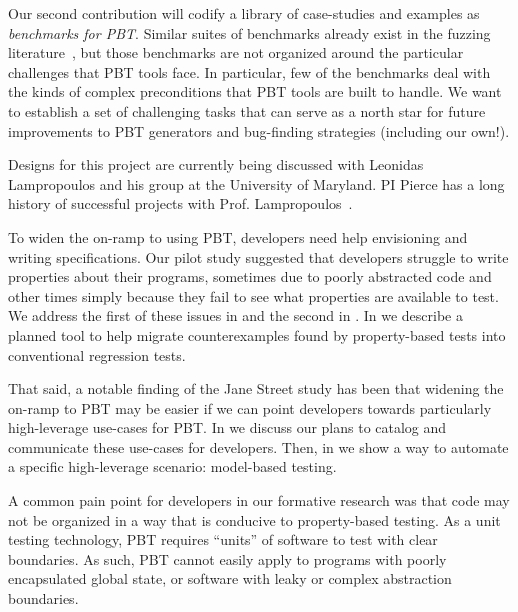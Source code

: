 Our second contribution will codify a library of case-studies and examples as
{\em benchmarks for PBT}. Similar suites of benchmarks already exist in the
fuzzing literature~\cite{hazimeh_magma_2021}, but those benchmarks are not
organized around the particular challenges that PBT tools face. In particular,
few of the benchmarks deal with the kinds of complex preconditions that PBT
tools are built to handle. We want to establish a set of challenging tasks that
can serve as a north star for future improvements to PBT generators and
bug-finding strategies (including our own!).

Designs for this project are currently being discussed with Leonidas
Lampropoulos and his group at the University of Maryland. PI Pierce has a long
history of successful projects with Prof.
Lampropoulos~\cite[etc.]{LuckPOPL,goldstein2021dojudgeatest,lampropoulos_coverage_2019,Lampropoulos&18,OLDlampropoulos19fuzzchick}.

\iflater{}\fi

To widen the on-ramp to using PBT, developers need help envisioning and writing
specifications. Our pilot study suggested that developers struggle to write
properties about their programs, sometimes due to poorly abstracted code and
other times simply because they fail to see what properties are available to
test. We address the first of these issues in  and
the second in .
%
%
In
 we describe a planned tool to help migrate
counterexamples found by property-based tests into conventional regression tests.

That said, a notable finding of the Jane Street study has been that widening the
on-ramp to PBT may be easier if we can point developers towards particularly
high-leverage use-cases for PBT. In  we discuss our plans
to catalog and communicate these use-cases for developers. Then, in
 we show a way to automate a specific high-leverage
scenario: model-based testing.

A common pain point for developers in our formative research
was that code may not be organized in a way that is conducive to property-based
testing. As a unit testing technology, PBT requires ``units'' of software to
test with clear boundaries. As such, PBT cannot easily apply to programs with
poorly encapsulated global state, or software with leaky or complex abstraction
boundaries.

